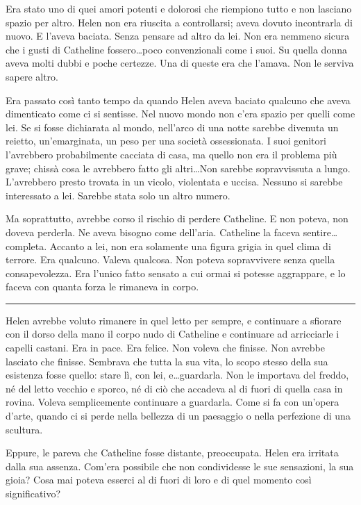 Era stato uno di quei amori potenti e dolorosi che riempiono tutto e non lasciano spazio per altro.
Helen non era riuscita a controllarsi; aveva dovuto incontrarla di nuovo. E l'aveva baciata. Senza
pensare ad altro da lei. Non era nemmeno sicura che i gusti di Catheline fossero\dots poco
convenzionali come i suoi. Su quella donna aveva molti dubbi e poche certezze. Una di queste era che
l'amava. Non le serviva sapere altro.

Era passato così tanto tempo da quando Helen aveva baciato qualcuno che aveva dimenticato come ci si
sentisse. Nel nuovo mondo non c'era spazio per quelli come lei. Se si fosse dichiarata al mondo,
nell'arco di una notte sarebbe divenuta un reietto, un'emarginata, un peso per una società
ossessionata. I suoi genitori l'avrebbero probabilmente cacciata di casa, ma quello non era il
problema più grave; chissà cosa le avrebbero fatto gli altri\dots Non sarebbe sopravvissuta a lungo.
L'avrebbero presto trovata in un vicolo, violentata e uccisa. Nessuno si sarebbe interessato a lei.
Sarebbe stata solo un altro numero.

Ma soprattutto, avrebbe corso il rischio di perdere Catheline. E non poteva, non doveva perderla. Ne
aveva bisogno come dell'aria. Catheline la faceva sentire\dots completa. Accanto a lei, non era
solamente una figura grigia in quel clima di terrore. Era qualcuno. Valeva qualcosa. Non poteva
sopravvivere senza quella consapevolezza. Era l'unico fatto sensato a cui ormai si potesse
aggrappare, e lo faceva con quanta forza le rimaneva in corpo.

\plainbreak{1}

Helen avrebbe voluto rimanere in quel letto per sempre, e continuare a sfiorare con il dorso della
mano il corpo nudo di Catheline e continuare ad arricciarle i capelli castani. Era in pace. Era
felice. Non voleva che finisse. Non avrebbe lasciato che finisse. Sembrava che tutta la sua vita, lo
scopo stesso della sua esistenza fosse quello: stare lì, con lei, e\dots guardarla. Non le importava
del freddo, né del letto vecchio e sporco, né di ciò che accadeva al di fuori di quella casa in
rovina. Voleva semplicemente continuare a guardarla. Come si fa con un'opera d'arte, quando ci si
perde nella bellezza di un paesaggio o nella perfezione di una scultura.

Eppure, le pareva che Catheline fosse distante, preoccupata. Helen era irritata dalla sua assenza.
Com'era possibile che non condividesse le sue sensazioni, la sua gioia? Cosa mai poteva esserci al
di fuori di loro e di quel momento così significativo?


